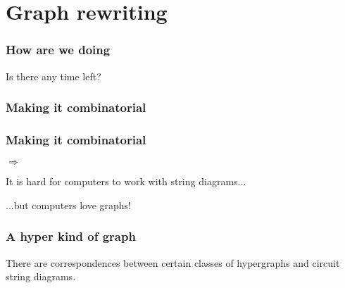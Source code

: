 \section{Graph rewriting}

\begin{frame}
    \frametitle{How are we doing}

    Is there any time left?

\end{frame}

\begin{frame}
    \frametitle{Making it combinatorial}

    \LARGE
    \centering


\end{frame}

\begin{frame}
    \frametitle{Making it combinatorial}

    \centering

    \pause

    \Large
    \pause
    \(\Rightarrow\)

    \pause

    \vspace{1.5em}

    It is \alert{hard} for computers to work with string diagrams...

    \pause

    ...but computers \alert{love} graphs!

\end{frame}

\begin{frame}
    \frametitle{A hyper kind of graph}

    \centering


    \vspace{1em}

    \pause
    \Large

    There are correspondences between \alert{certain classes of hypergraphs} and
    \alert{circuit string diagrams}.

    \pause
    \normalsize
    \vspace{1em}


\end{frame}

